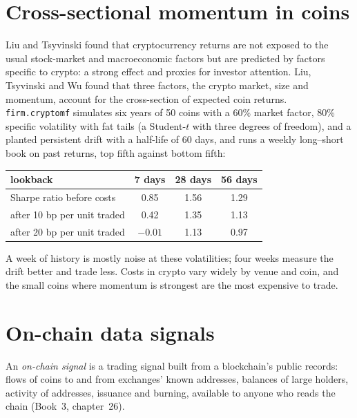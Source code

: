 \section{Cross-sectional momentum in coins}

Liu and Tsyvinski found that cryptocurrency returns are not exposed to the usual stock-market and macroeconomic factors but are predicted by factors
specific to crypto: a strong  effect and proxies for investor attention. Liu, Tsyvinski and Wu found that three factors, the crypto
market, size and momentum, account for the cross-section of expected coin returns. \texttt{firm.cryptomf} simulates six years of 50 coins with a 60\%
market factor, 80\% specific volatility with fat tails (a Student-$t$ with three degrees of freedom), and a planted persistent drift with a half-life of 60
days, and runs a weekly long--short book on past returns, top fifth against bottom fifth:

\begin{center}
\small
\begin{tabular}{@{}lccc@{}}
\toprule
lookback & 7 days & 28 days & 56 days\\
\midrule
Sharpe ratio before costs & 0.85 & 1.56 & 1.29\\
after 10 bp per unit traded & 0.42 & 1.35 & 1.13\\
after 20 bp per unit traded & $-0.01$ & 1.13 & 0.97\\
\bottomrule
\end{tabular}
\end{center}

A week of history is mostly noise at these volatilities; four weeks measure the drift better and trade less. Costs in crypto vary widely by venue and
coin, and the small coins where momentum is strongest are the most expensive to trade.

\section{On-chain data signals}

\begin{definition}\label{def:s1:crypto-medium-frequency-strategies:onchain}
An \emph{on-chain signal} is a trading signal built from a blockchain's public records: flows of coins to and from exchanges'
known addresses, balances of large holders, activity of addresses, issuance and burning, available to anyone who reads the chain (Book~3,
chapter~26).
\end{definition}

